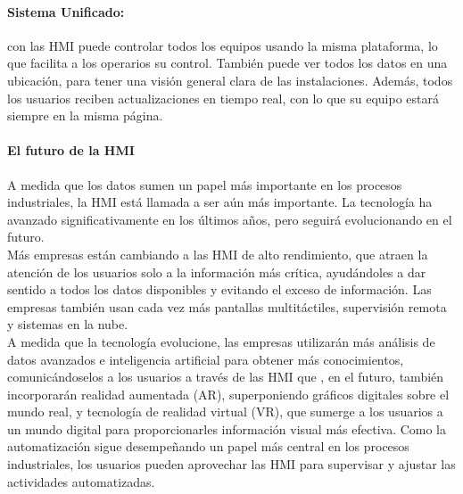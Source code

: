 \documentclass[12pt,titlepage]{article}
\begin{document}
\paragraph*{Sistema Unificado:} con las HMI puede controlar todos los equipos usando la misma plataforma, lo que facilita a los operarios su control. También puede ver todos los datos en una ubicación, para tener una visión general clara de las instalaciones. Además, todos los usuarios reciben actualizaciones en tiempo real, con lo que su equipo estará siempre en la misma página. \\

\paragraph{El futuro de la HMI}\leavevmode\newline
A medida que los datos sumen un papel más importante en los procesos industriales, la HMI está llamada a ser aún más importante. La tecnología ha avanzado significativamente en los últimos años, pero seguirá evolucionando en el futuro. \\

Más empresas están cambiando a las HMI de alto rendimiento, que atraen la atención de los usuarios solo a la información más crítica, ayudándoles a dar sentido a todos los datos disponibles y evitando el exceso de información. Las empresas también usan cada vez más pantallas multitáctiles, supervisión remota y sistemas en la nube. \\

A medida que la tecnología evolucione, las empresas utilizarán más análisis de datos avanzados e inteligencia artificial para obtener más conocimientos, comunicándoselos a los usuarios a través de las HMI que , en el futuro, también incorporarán realidad aumentada (AR), superponiendo gráficos digitales sobre el mundo real, y tecnología de realidad virtual (VR), que sumerge a los usuarios a un mundo digital para proporcionarles información visual más efectiva. Como la automatización sigue desempeñando un papel más central en los procesos industriales, los usuarios pueden aprovechar las HMI para supervisar y ajustar las actividades automatizadas. \\
\end{document}
